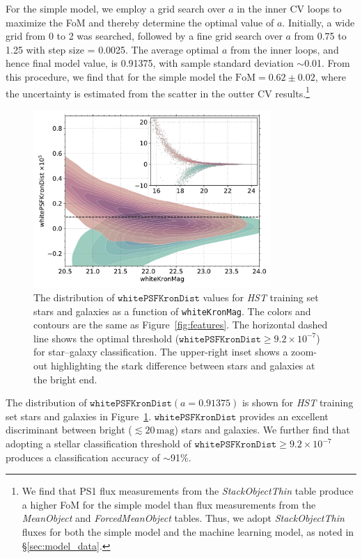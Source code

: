 \documentclass[twocolumn]{aastex62}
\begin{document}
For the simple model, we employ a grid search over $a$ in the inner CV loops
to maximize the FoM and thereby determine the optimal value of $a$.
Initially, a wide grid from 0 to 2 was searched, followed by a fine grid
search over $a$ from 0.75 to 1.25 with step size = 0.0025. The average
optimal $a$ from the inner loops, and hence final model value, is 0.91375,
with sample standard deviation $\sim$0.01. From this procedure, we find that
for the simple model the $\mathrm{FoM} = 0.62 \pm 0.02$, where the
uncertainty is estimated from the scatter in the outter CV
results.\footnote{We find that PS1 flux measurements from the
\textit{StackObjectThin} table produce a higher FoM for the simple model
than flux measurements from the \textit{MeanObject} and
\textit{ForcedMeanObject} tables. Thus, we adopt \textit{StackObjectThin}
fluxes for both the simple model and the machine learning model, as noted in
\S\ref{sec:model_data}.}


\begin{figure}[t]
 \centering
  \includegraphics[width=3.55in]{./Figures/whitePSFKronDist.pdf}
  \caption{ The distribution of $\mathtt{whitePSFKronDist}$ values for
  \textit{HST} training set stars and galaxies as a function of
  \texttt{whiteKronMag}. The colors and contours are the same as
  Figure~\ref{fig:features}. The horizontal dashed line shows the optimal
  threshold ($\mathtt{whitePSFKronDist} \ge 9.2 \times 10^{-7}$) for
  star--galaxy classification. The upper-right inset shows a zoom-out
  highlighting the stark difference between stars and galaxies at the bright
  end. }
  \label{fig:psfkrondist}
\end{figure}

The distribution of $\mathtt{whitePSFKronDist}(a=0.91375)$ is shown for
\textit{HST} training set stars and galaxies in
Figure~\ref{fig:psfkrondist}. $\mathtt{whitePSFKronDist}$ provides an
excellent discriminant between bright ($\lesssim 20\,\mathrm{mag}$) stars
and galaxies. We further find that adopting a stellar classification
threshold of $\mathtt{whitePSFKronDist} \ge 9.2 \times 10^{-7}$ produces a
classification accuracy of $\sim$91\%.
\end{document}
